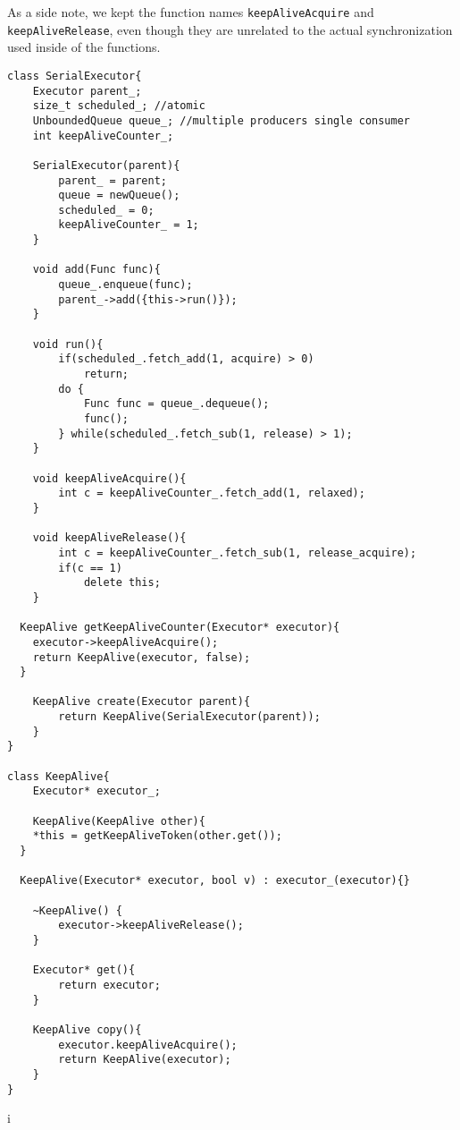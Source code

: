 As a side note, we kept the function names \texttt{keepAliveAcquire} and \texttt{keepAliveRelease}, even though they are unrelated to the actual synchronization used inside of the functions.

\begin{lstlisting}
class SerialExecutor{
	Executor parent_;
	size_t scheduled_; //atomic
	UnboundedQueue queue_; //multiple producers single consumer
	int keepAliveCounter_;

	SerialExecutor(parent){
		parent_ = parent;
		queue = newQueue();
		scheduled_ = 0;
		keepAliveCounter_ = 1;
	}

	void add(Func func){
		queue_.enqueue(func);
		parent_->add({this->run()});
	}

	void run(){
		if(scheduled_.fetch_add(1, acquire) > 0)
			return;
		do {
			Func func = queue_.dequeue();
			func();
		} while(scheduled_.fetch_sub(1, release) > 1);
	}

	void keepAliveAcquire(){
		int c = keepAliveCounter_.fetch_add(1, relaxed);
	}

	void keepAliveRelease(){
		int c = keepAliveCounter_.fetch_sub(1, release_acquire);
		if(c == 1)
			delete this;
	}

  KeepAlive getKeepAliveCounter(Executor* executor){
    executor->keepAliveAcquire();
    return KeepAlive(executor, false);
  }

	KeepAlive create(Executor parent){
		return KeepAlive(SerialExecutor(parent));
	}
}

class KeepAlive{
	Executor* executor_;

	KeepAlive(KeepAlive other){
    *this = getKeepAliveToken(other.get());
  }

  KeepAlive(Executor* executor, bool v) : executor_(executor){}

	~KeepAlive() {
		executor->keepAliveRelease();
	}

	Executor* get(){
		return executor;
	}

	KeepAlive copy(){
		executor.keepAliveAcquire();
		return KeepAlive(executor);
	}
}
\end{lstlisting}
i%
